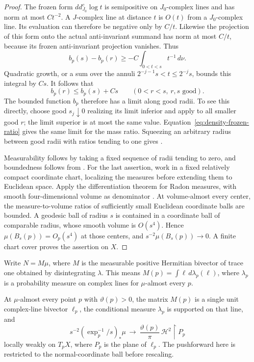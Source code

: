 \begin{proof}
The frozen form \(dd^c_{J_0}\log t\) is semipositive on \(J_0\)-complex
lines and has norm at most \(Ct^{-2}\).  A \(J\)-complex line at distance
\(t\) is \(O(t)\) from a \(J_0\)-complex line.  Its evaluation can
therefore be negative only by \(C/t\).  Likewise the projection of this
form onto the actual anti-invariant summand has norm at most \(C/t\),
because its frozen anti-invariant projection vanishes.  Thus
\[
 b_p(s)-b_p(r)\ge
 -C\int_{0<t<s}t^{-1}\,d\nu.
\]
Quadratic growth, or a sum over the annuli
\(2^{-j-1}s<t\le2^{-j}s\), bounds this integral by \(Cs\).
It follows that
\begin{equation}\label{eq:density-almost-monotonicity}
 b_p(r)\le b_p(s)+Cs\qquad(0<r<s,\ r,s\text{ good}).
\end{equation}
The bounded function \(b_p\) therefore has a limit along good radii.
To see this directly, choose good \(s_j\downarrow0\) realizing its
limit inferior and apply  to all
smaller good \(r\); the limit superior is at most the same value.
Equation~\eqref{eq:density-frozen-ratio} gives the same limit for the
mass ratio.  Squeezing an arbitrary radius between good radii with
ratios tending to one gives .

Measurability follows by taking a fixed sequence of radii tending to
zero, and boundedness follows from .
For the last assertion, work in a fixed relatively compact coordinate
chart, localizing the measures before extending them to Euclidean
space. Apply the differentiation theorem for Radon measures, with
smooth four-dimensional volume as denominator
\cite[Theorem~4.19]{Kinnunen2026}. At volume-almost every center, the
measure-to-volume ratios of sufficiently small Euclidean coordinate
balls are bounded. A geodesic ball of radius \(s\) is contained in a
coordinate ball of comparable radius, whose smooth volume is
\(O(s^4)\). Hence \(\mu(B_s(p))=O_p(s^4)\) at those centers, and
\(s^{-2}\mu(B_s(p))\to0\). A finite chart cover proves the assertion
on \(X\).
\end{proof}

Write \(N=M\mu\), where \(M\) is the measurable positive Hermitian
bivector of trace one obtained by disintegrating \(\lambda\).  This
means \(M(p)=\int\ell\,d\lambda_p(\ell)\), where \(\lambda_p\) is a
probability measure on complex lines for \(\mu\)-almost every \(p\).

\begin{lemma}
\label{lem:density-planar-tangents}
At \(\mu\)-almost every point \(p\) with \(\vartheta(p)>0\), the matrix
\(M(p)\) is a single unit complex-line bivector \(\ell_p\), the
conditional measure \(\lambda_p\) is supported on that line, and
\[
 s^{-2}(\exp_p^{-1}/s)_*\mu
 \ \longrightarrow\
 \frac{\vartheta(p)}{\pi}\,
 \mathcal H^2\!\restriction P_p
\]
locally weakly on \(T_pX\), where \(P_p\) is the plane of \(\ell_p\).
The pushforward here is restricted to the normal-coordinate ball before
rescaling.
\end{lemma}

